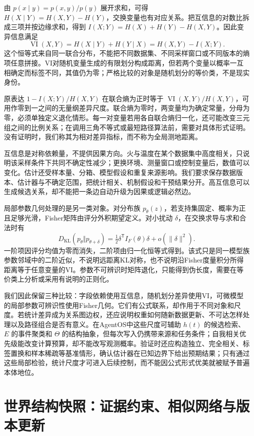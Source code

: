 由 $p(x\mid y)=p(x,y)/p(y)$ 展开求和，可得 $H(X\mid Y)=H(X,Y)-H(Y)$，交换变量也有对应关系。把互信息的对数比拆成三项并按边缘求和，得到 $I(X;Y)=H(X)+H(Y)-H(X,Y)$。因此变异信息满足
\[
\operatorname{VI}(X,Y)=H(X\mid Y)+H(Y\mid X)=H(X,Y)-I(X;Y).
\]
这个恒等式来自同一联合分布，不能把不同数据集、不同采样窗口或不同版本的熵项任意拼接。VI对随机变量生成的有限划分构成距离，但若两个变量以概率一互相确定而标签不同，其值仍为零；严格比较的对象是随机划分的等价类，不是现实身份。

原表达 $1-I(X;Y)/H(X,Y)$ 在联合熵为正时等于 $\operatorname{VI}(X,Y)/H(X,Y)$，可用作零到一之间的无量纲差异尺度。联合熵为零时，两变量均为确定常量，分母为零，必须单独定义退化情形。每一对变量若用各自联合熵归一化，还可能改变三元组之间的比例关系；在调用三角不等式或最短路径算法前，需要对具体形式证明。没有证明时，我们称其为相对差异指标，而不称为全局测地距离。

互信息是对称依赖量，不提供因果方向。火与温度在某个数据集中高度相关，只说明该采样条件下共同不确定性减少；更换环境、测量窗口或控制变量后，数值可以变化。估计还受样本量、分箱、模型假设和重复来源影响。我们要求保存数据版本、估计器与不确定范围，把统计相关、机制假设和干预结果分开。高互信息可以生成候选关系，却不能把一条边自动升级为因果或逻辑必然边。

局部参数几何处理的是另一类对象。对分布族 $p_\theta(z)$，若支持集固定、概率为正且足够光滑，Fisher矩阵由评分外积期望定义。对小扰动 $\delta$，在交换求导与求和合法时有
\[
D_{\mathrm{KL}}(p_\theta\Vert p_{\theta+\delta})=\tfrac12\delta^{\mathsf T}I_F(\theta)\delta+o(\|\delta\|^2).
\]
一阶项因评分均值为零而消失，二阶项由归一化恒等式得到。该式只是同一模型族参数邻域中的二阶近似，不说明远距离KL对称，也不说明沿Fisher度量积分所得距离等于任意变量的VI。参数不可辨识时矩阵退化，只能得到伪长度，需要在等价类上分析或采用有说明的正则化。

我们因此保留三种比较：字段依赖使用互信息，随机划分差异使用VI，可微模型的局部参数可辨识性使用Fisher几何。它们有公式联系，却作用于不同对象和尺度。若统计差异成为关系图边权，还应说明权重如何随新数据更新、不可达怎样处理以及路径组合是否有意义。在AgentOS中这些尺度可辅助 $h(t)$ 的候选检索、$E$ 的事件聚类和 $\Theta$ 的结构抽象，但每次写入仍携带来源和任务条件；自我相关优先级能改变计算预算，却不能改写观测概率。验证时还应构造独立、完全相关、标签置换和样本稀疏等基准情形，确认估计器在已知边界下给出预期结果；只有通过这些局部检验，统计尺度才可进入后续控制，而不能因公式形式优美就被赋予普遍本体地位。

\section{世界结构快照：证据约束、相似网络与版本更新}
\label{sec:section_220}

